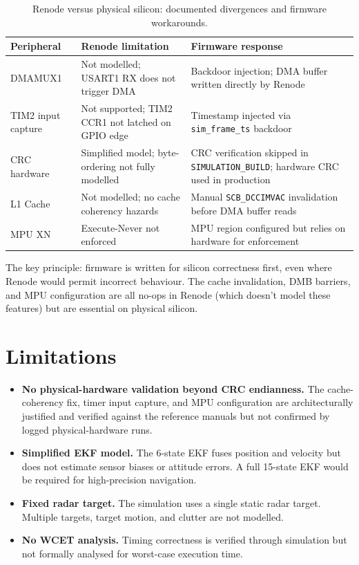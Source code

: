 \begin{table}[htbp]
\centering
\caption{Renode versus physical silicon: documented divergences and firmware workarounds.}
\label{tab:5.3}
\begin{tabularx}{\textwidth}{@{}p{3.2cm}Yp{3.2cm}@{}}
\toprule
\textbf{Peripheral} & \textbf{Renode limitation} & \textbf{Firmware response} \\
\midrule
DMAMUX1 & Not modelled; USART1 RX does not trigger DMA & Backdoor injection; DMA buffer written directly by Renode \\
TIM2 input capture & Not supported; TIM2 CCR1 not latched on GPIO edge & Timestamp injected via \texttt{sim\_frame\_ts} backdoor \\
CRC hardware & Simplified model; byte-ordering not fully modelled & CRC verification skipped in \texttt{SIMULATION\_BUILD}; hardware CRC used in production \\
L1 Cache & Not modelled; no cache coherency hazards & Manual \texttt{SCB\_DCCIMVAC} invalidation before DMA buffer reads \\
MPU XN & Execute-Never not enforced & MPU region configured but relies on hardware for enforcement \\
\bottomrule
\end{tabularx}
\end{table}

The key principle: firmware is written for silicon correctness first, even where Renode would permit incorrect behaviour. The cache invalidation, DMB barriers, and MPU configuration are all no-ops in Renode (which doesn't model these features) but are essential on physical silicon.

\section{Limitations}

\begin{itemize}
\item \textbf{No physical-hardware validation beyond CRC endianness.} The cache-coherency fix, timer input capture, and MPU configuration are architecturally justified and verified against the reference manuals but not confirmed by logged physical-hardware runs.
\item \textbf{Simplified EKF model.} The 6-state EKF fuses position and velocity but does not estimate sensor biases or attitude errors. A full 15-state EKF would be required for high-precision navigation.
\item \textbf{Fixed radar target.} The simulation uses a single static radar target. Multiple targets, target motion, and clutter are not modelled.
\item \textbf{No WCET analysis.} Timing correctness is verified through simulation but not formally analysed for worst-case execution time.
\end{itemize}